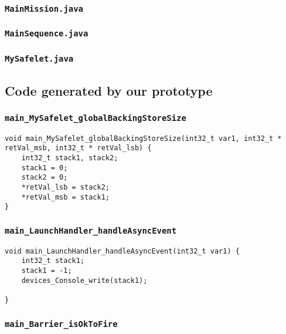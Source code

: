 \begin{landscape}
\begin{multicols}{2}
\subsubsection{\texttt{MainMission.java}}


\subsubsection{\texttt{MainSequence.java}}


\subsubsection{\texttt{MySafelet.java}}


\subsection{Code generated by our prototype}
\label{Barrier-code-our-subsection}

\subsubsection{\texttt{main\_MySafelet\_globalBackingStoreSize}}

\begin{lstlisting}[firstnumber=262]
void main_MySafelet_globalBackingStoreSize(int32_t var1, int32_t * retVal_msb, int32_t * retVal_lsb) {
	int32_t stack1, stack2;
	stack1 = 0;
	stack2 = 0;
	*retVal_lsb = stack2;
	*retVal_msb = stack1;
}
\end{lstlisting}

\subsubsection{\texttt{main\_LaunchHandler\_handleAsyncEvent}}

\begin{lstlisting}[firstnumber=465]
void main_LaunchHandler_handleAsyncEvent(int32_t var1) {
	int32_t stack1;
	stack1 = -1;
	devices_Console_write(stack1);

}
\end{lstlisting}

\subsubsection{\texttt{main\_Barrier\_isOkToFire}}


\end{multicols}
\end{landscape}
